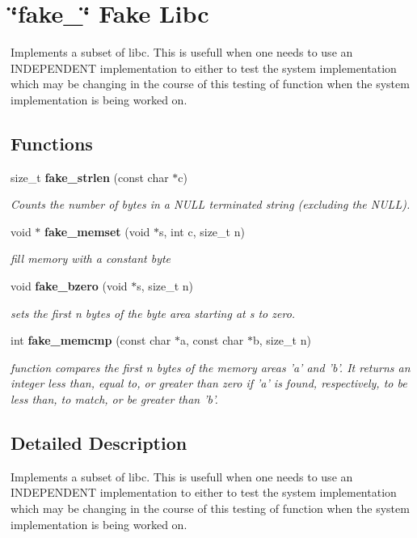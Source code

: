\section{\char`\"{}fake\_\-\char`\"{} Fake Libc}
\label{group__fake__lib}
Implements a subset of libc. This is usefull when one needs to use an INDEPENDENT implementation to either to test the system implementation which may be changing in the course of this testing of function when the system implementation is being worked on. 
\subsection*{Functions}
\begin{CompactItemize}
\item 
size\_\-t {\bf fake\_\-strlen} (const char $\ast$c)
\begin{CompactList}\small\item\em Counts the number of bytes in a NULL terminated string (excluding the NULL).\item\end{CompactList}\item 
void $\ast$ {\bf fake\_\-memset} (void $\ast$s, int c, size\_\-t n)
\begin{CompactList}\small\item\em fill memory with a constant byte\item\end{CompactList}\item 
void {\bf fake\_\-bzero} (void $\ast$s, size\_\-t n)
\begin{CompactList}\small\item\em sets the first n bytes of the byte area starting at s to zero.\item\end{CompactList}\item 
int {\bf fake\_\-memcmp} (const char $\ast$a, const char $\ast$b, size\_\-t n)
\begin{CompactList}\small\item\em function compares the first n bytes of the memory areas 'a' and 'b'. It returns an integer less than, equal to, or greater than zero if 'a' is found, respectively, to be less than, to match, or be greater than 'b'.\item\end{CompactList}\end{CompactItemize}


\subsection{Detailed Description}
Implements a subset of libc. This is usefull when one needs to use an INDEPENDENT implementation to either to test the system implementation which may be changing in the course of this testing of function when the system implementation is being worked on.



